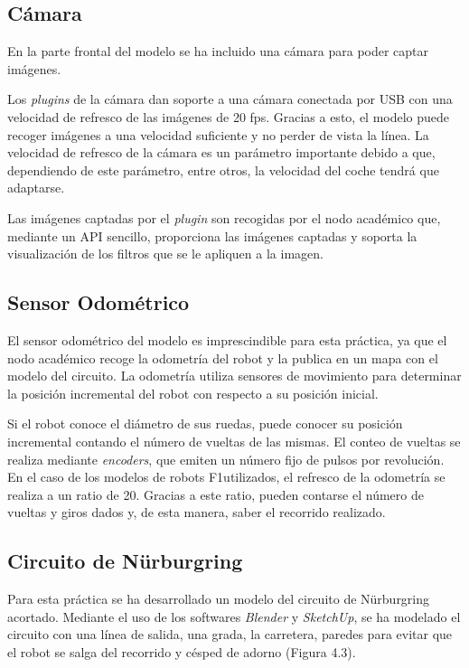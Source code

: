 \subsection{Cámara}
En la parte frontal del modelo se ha incluido una cámara para poder captar imágenes.

Los \textit{plugins} de la cámara dan soporte a una cámara conectada por USB con una velocidad de refresco de las imágenes de 20 fps. Gracias a esto, el modelo puede recoger imágenes a una velocidad suficiente y no perder de vista la línea. La velocidad de refresco de la cámara es un parámetro importante debido a que, dependiendo de este parámetro, entre otros, la velocidad del coche tendrá que adaptarse.

Las imágenes captadas por el \textit{plugin} son recogidas por el nodo académico que, mediante un API sencillo, proporciona las imágenes captadas y soporta la visualización de los filtros que se le apliquen a la imagen.

\subsection{Sensor Odométrico}
El sensor odométrico del modelo es imprescindible para esta práctica, ya que el nodo académico recoge la odometría del robot y la publica en un mapa con el modelo del circuito. La odometría utiliza sensores de movimiento para determinar la posición  incremental del robot con respecto a su posición inicial.

Si el robot conoce el diámetro de sus ruedas, puede conocer su posición incremental contando el número de vueltas de las mismas. El conteo de vueltas se realiza mediante \textit{encoders}, que emiten un número fijo de pulsos por revolución. En el caso de los modelos de robots F1utilizados, el refresco de la odometría se realiza a un ratio de 20. Gracias a este ratio, pueden contarse el número de vueltas y giros dados y, de esta manera, saber el recorrido realizado.

\subsection{Circuito de Nürburgring}
Para esta práctica se ha desarrollado un modelo del circuito de Nürburgring acortado. Mediante el uso de los softwares \textit{Blender} y \textit{SketchUp}, se ha modelado el circuito con una línea de salida, una grada, la carretera, paredes para evitar que el robot se salga del recorrido y césped de adorno (Figura 4.3).

